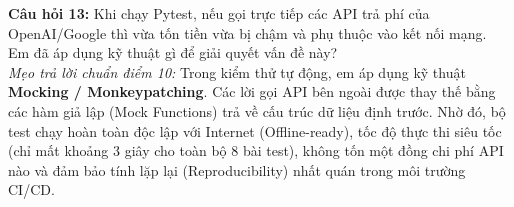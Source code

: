 \begin{checkpointbox}
\textbf{Câu hỏi 13:} Khi chạy Pytest, nếu gọi trực tiếp các API trả phí của OpenAI/Google thì vừa tốn tiền vừa bị chậm và phụ thuộc vào kết nối mạng. Em đã áp dụng kỹ thuật gì để giải quyết vấn đề này?\\
\textit{Mẹo trả lời chuẩn điểm 10:} Trong kiểm thử tự động, em áp dụng kỹ thuật \textbf{Mocking / Monkeypatching}. Các lời gọi API bên ngoài được thay thế bằng các hàm giả lập (Mock Functions) trả về cấu trúc dữ liệu định trước. Nhờ đó, bộ test chạy hoàn toàn độc lập với Internet (Offline-ready), tốc độ thực thi siêu tốc (chỉ mất khoảng 3 giây cho toàn bộ 8 bài test), không tốn một đồng chi phí API nào và đảm bảo tính lặp lại (Reproducibility) nhất quán trong môi trường CI/CD.
\end{checkpointbox}

